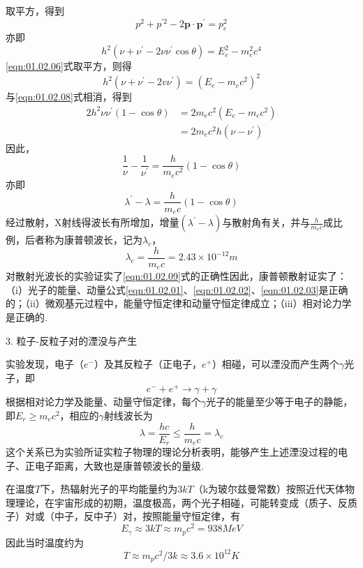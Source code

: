取平方，得到
\begin{equation*}
	p^{2}+p^{\prime 2}-2\boldsymbol{p}\cdot\boldsymbol{p^{\prime}}=p_{e}^{2}
\end{equation*}
亦即
\begin{equation}\label{eqn:01.02.08}
	h^{2}(\nu+\nu^{\prime}-2\nu\nu^{\prime}\cos\theta)=E_{e}^{2}-m_{e}^{2}c^{4}
\end{equation}
\eqref{eqn:01.02.06}式取平方，则得
\begin{equation*}
	h^{2}(\nu+\nu^{\prime}-2v\nu^{\prime})=(E_{e}-m_{e}c^{2})^{2}
\end{equation*}
与\eqref{eqn:01.02.08}式相消，得到
\begin{equation}
	\begin{aligned}
		2h^{2}\nu\nu^{\prime}(1-\cos\theta) &=2m_{e}c^{2}(E_{e}-m_{e}c^{2}) \\
		&=2m_{e}c^{2}h(\nu-\nu^{\prime})
	\end{aligned}
\end{equation}
因此，
\begin{equation*}
	\frac{1}{\nu}-\frac{1}{\nu^{\prime}}=\frac{h}{m_{e}c^{2}}(1-\cos\theta)
\end{equation*}
亦即
\begin{equation}\label{eqn:01.02.09}
	\boxed{\lambda^{\prime}-\lambda=\frac{h}{m_{e}c}(1-\cos\theta)}
\end{equation}
经过散射，X射线得波长有所增加，增量$(\lambda^{\prime}-\lambda)$与散射角有关，并与$\frac{h}{m_{e}c}$成比例，后者称为康普顿波长，记为$\lambda_{c}$，
\begin{equation}\label{eqn:01.02.10}
	\lambda_{c}=\frac{h}{m_{e}c}=2.43\times10^{-12} \si{m}
\end{equation}
对散射光波长的实验证实了\eqref{eqn:01.02.09}式的正确性因此，康普顿散射证实了：（i）光子的能量、动量公式\eqref{eqn:01.02.01}、\eqref{eqn:01.02.02}、\eqref{eqn:01.02.03}是正确的；（ii）微观基元过程中，能量守恒定律和动量守恒定律成立；（iii）相对论力学是正确的.

\textsf{3. 粒子-反粒子对的湮没与产生}

实验发现，电子（$e^{-}$）及其反粒子（正电子，$e^{+}$）相碰，可以湮没而产生两个$\gamma$光子，即
\begin{equation*}
	e^{-}+e^{+}\rightarrow \gamma+\gamma
\end{equation*}
根据相对论力学及能量、动量守恒定律，每个$\gamma$光子的能量至少等于电子的静能，即$E_{r}\geqslant m_{e}c^{2}$，相应的$\gamma$射线波长为
\begin{equation*}
	\lambda=\frac{hc}{E_{r}}\leqslant\frac{h}{m_{e}c}=\lambda_{c}
\end{equation*}
这个关系已为实验所证实粒子物理的理论分析表明，能够产生上述湮没过程的电子、正电子距离，大致也是康普顿波长的量级.

在温度$T$下，热辐射光子的平均能量约为$3kT$（k为玻尔兹曼常数）按照近代天体物理理论，在宇宙形成的初期，温度极高，两个光子相碰，可能转变成（质子、反质子）对或（中子，反中子）对，按照能量守恒定律，有
\begin{equation*}
	E_{\gamma}\approx3kT\approx m_{p}c^{2}=938 \si{MeV}
\end{equation*}
因此当时温度约为
\begin{equation*}
	T\approx m_{p}c^{2} \big/ 3k\approx3.6\times10^{12} \si{K}
\end{equation*}


